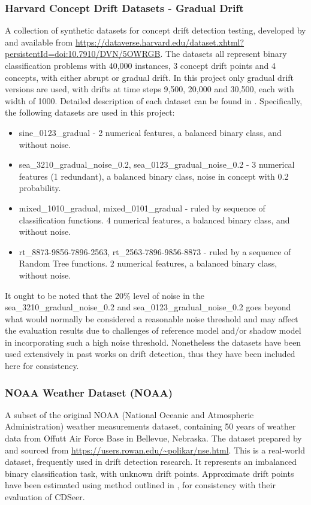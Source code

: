 \documentclass{svproc}
\begin{document}
\subsubsection{Harvard Concept Drift Datasets - Gradual Drift}A collection of synthetic datasets for concept drift detection testing, developed by \cite{lopez2020} and available from \url{https://dataverse.harvard.edu/dataset.xhtml?persistentId=doi:10.7910/DVN/5OWRGB}. 
The datasets all represent binary classification problems with 40,000 instances, 3 concept drift points and 4 concepts, with either abrupt or gradual drift. In this project only gradual drift versions are used, with drifts at time steps 9,500, 20,000 and 30,500, each with width of 1000. Detailed description of each dataset can be found in \cite{lopez2020}. Specifically, the following datasets are used in this project: 
\begin{itemize}
	\item sine\_0123\_gradual - 2 numerical features, a balanced binary class, and without noise. 
	\item sea\_3210\_gradual\_noise\_0.2, sea\_0123\_gradual\_noise\_0.2 - 3 numerical features (1 redundant), a balanced binary class, noise in concept with 0.2 probability.
	\item mixed\_1010\_gradual, mixed\_0101\_gradual - ruled by sequence of classification functions. 4 numerical features, a balanced binary class, and without noise.
	\item rt\_8873-9856-7896-2563, rt\_2563-7896-9856-8873 - ruled by a sequence of Random Tree functions. 2 numerical features, a balanced binary class, without noise.
\end{itemize}
It ought to be noted that the 20\% level of noise in the sea\_3210\_gradual\_noise\_0.2 and sea\_0123\_gradual\_noise\_0.2 goes beyond what would normally be considered a reasonable noise threshold and may affect the evaluation results due to challenges of reference model and/or shadow model in incorporating such a high noise threshold. Nonetheless the datasets have been used extensively in past works on drift detection, thus they have been included here for consistency.

\subsubsection{NOAA Weather Dataset (NOAA)}A subset of the original NOAA (National Oceanic and Atmospheric Administration) weather measurements dataset, containing 50 years of weather data from Offutt Air Force Base in Bellevue, Nebraska. The dataset prepared by \cite{ditzler2012} and sourced from \url{https://users.rowan.edu/~polikar/nse.html}.
This is a real-world dataset, frequently used in drift detection research. It represents an imbalanced binary classification task, with unknown drift points. Approximate drift points have been estimated using method outlined in \cite{pham2025}, for consistency with their evaluation of CDSeer.
\end{document}
